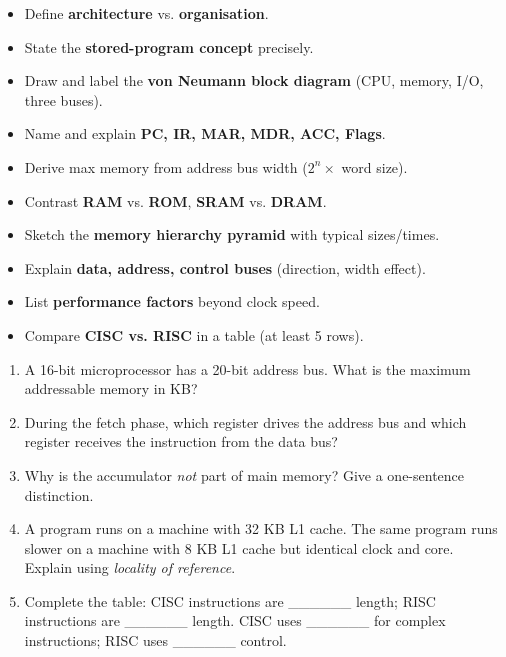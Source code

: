 \documentclass[11pt]{article}
\begin{document}
\begin{aretenir}
\begin{itemize}
\item Define \textbf{architecture} vs. \textbf{organisation}.
\item State the \textbf{stored-program concept} precisely.
\item Draw and label the \textbf{von Neumann block diagram} (CPU, memory, I/O, three buses).
\item Name and explain \textbf{PC, IR, MAR, MDR, ACC, Flags}.
\item Derive max memory from address bus width ($2^n \times$ word size).
\item Contrast \textbf{RAM} vs. \textbf{ROM}, \textbf{SRAM} vs. \textbf{DRAM}.
\item Sketch the \textbf{memory hierarchy pyramid} with typical sizes/times.
\item Explain \textbf{data, address, control buses} (direction, width effect).
\item List \textbf{performance factors} beyond clock speed.
\item Compare \textbf{CISC vs. RISC} in a table (at least 5 rows).
\end{itemize}
\end{aretenir}

\begin{exercice}
\begin{enumerate}
\item A 16-bit microprocessor has a 20-bit address bus. What is the maximum addressable memory in KB?
\item During the fetch phase, which register drives the address bus and which register receives the instruction from the data bus?
\item Why is the accumulator \emph{not} part of main memory? Give a one-sentence distinction.
\item A program runs on a machine with 32 KB L1 cache. The same program runs slower on a machine with 8 KB L1 cache but identical clock and core. Explain using \emph{locality of reference}.
\item Complete the table: CISC instructions are \_\_\_\_\_\_ length; RISC instructions are \_\_\_\_\_\_ length. CISC uses \_\_\_\_\_\_ for complex instructions; RISC uses \_\_\_\_\_\_ control.
\end{enumerate}
\end{exercice}
\end{document}
